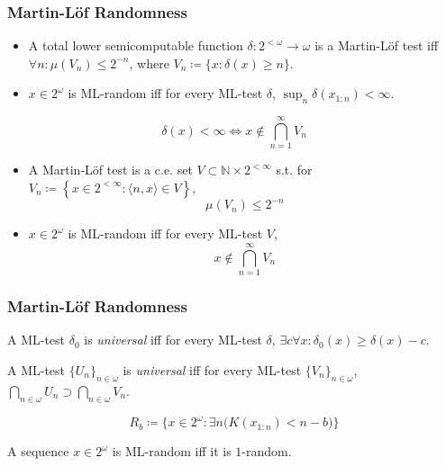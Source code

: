 \documentclass[UTF8,11pt,colorlinks,compress,openany]{beamer}%
\begin{document}
\begin{frame}\frametitle{Martin-L\"of Randomness}
\setlength\abovedisplayskip{0pt}
\setlength\belowdisplayskip{0pt}
\begin{definition}
\begin{itemize}
	\item A total lower semicomputable function $\delta: 2^{<\omega}\to\omega$ is a Martin-Löf test iff $\forall n:\mu(V_n)\leq 2^{-n}$, where $V_n\coloneqq \{x:\delta(x)\geq n\}$.
	\item $x\in 2^\omega$ is ML-random iff for every ML-test $\delta$, $\sup_n\delta(x_{1:n})<\infty$.
\end{itemize}
\end{definition}
\[\delta(x)<\infty\iff x\notin\bigcap\limits_{n=1}^\infty V_n\]
\begin{definition}
\begin{itemize}
	\item A Martin-Löf test is a c.e. set $V\subset\mathbb{N}\times 2^{<\infty}$ s.t. for $V_n\coloneqq\left\{x\in 2^{<\infty}: \langle n,x\rangle\in V\right\}$,
	\[\mu(V_n)\leq 2^{-n}\]
	\item $x\in 2^\omega$ is ML-random iff for every ML-test $V$,
	\[x\notin\bigcap\limits_{n=1}^\infty V_n\]
\end{itemize}
\end{definition}
\end{frame}

\begin{frame}\frametitle{Martin-L\"of Randomness}
\setlength\abovedisplayskip{0pt}
\setlength\belowdisplayskip{0pt}
\begin{definition}
A ML-test $\delta_0$ is \emph{universal} iff for every ML-test $\delta$, $\exists c\forall x:\delta_0(x)\geq\delta(x)-c$.
\end{definition}
A ML-test $\{U_n\}_{n\in\omega}$ is \emph{universal} iff for every ML-test $\{V_n\}_{n\in\omega}$, $\bigcap\limits_{n\in\omega}U_n\supset\bigcap\limits_{n\in\omega}V_n$.
\begin{center}
\end{center}
\[R_b\coloneqq \big\{x\in 2^\omega:\exists n\big(K(x_{1:n})<n-b\big)\big\}\]
\begin{center}
\end{center}
\begin{theorem}[Schnorr 1973]
A sequence $x\in 2^\omega$ is ML-random iff it is $1$-random.
\end{theorem}
\end{frame}
\end{document}
